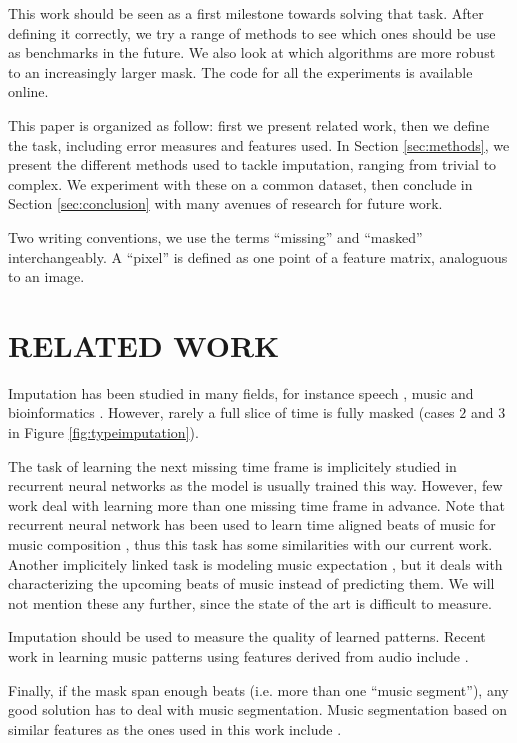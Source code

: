 \documentclass{article}
\begin{document}
This work should be seen as a first milestone towards solving that task.
After defining it correctly, we try a range of methods to see which ones should
be use as benchmarks in the future. We also look at which algorithms are more robust
to an increasingly larger mask. The code for all the experiments is available
online.

This paper is organized as follow: first we present related work, then we define the
task, including error measures and features used. In Section \ref{sec:methods},
we present the different methods used to tackle imputation, ranging from trivial
to complex. We experiment with these on a common dataset, then conclude in
Section \ref{sec:conclusion} with many avenues of research for future work.

Two writing conventions, we use the terms ``missing'' and ``masked'' interchangeably.
A ``pixel'' is defined as one point of a feature matrix, analoguous to an image.

\section{RELATED WORK}
\label{sec:relatedwork}
Imputation has been studied in many fields, for instance speech 
\cite{Morris1998,Reyes-Gomez2005,Smaragdis2009}, music \cite{Hoffman2010} 
and bioinformatics \cite{Oba2003}.
However, rarely a full slice of time is fully masked (cases $2$ and $3$
in Figure \ref{fig:typeimputation}).

The task of learning the next missing time frame is implicitely studied in recurrent
neural networks as the model is usually trained this way. However, few work deal
with learning more than one missing time frame in advance. Note that recurrent neural
network has been used to learn time aligned beats of music for music composition
\cite{Todd1989,Mozer1994a,Eck2002d}, thus this task has some similarities with our current
work. Another implicitely linked task is modeling music expectation \cite{Hazan2010}, but it deals
with characterizing the upcoming beats of music instead of predicting them.
We will not mention these any further, since the state of the art is difficult to measure.

Imputation should be used to measure the quality of learned patterns. Recent work in 
learning music patterns using features derived from audio include 
\cite{Anglade2009,Bertin-Mahieux2010a,Casey2007,Weiss2010}.

Finally, if the mask span enough beats (i.e. more than one ``music segment''), any good
solution has to deal with music segmentation. Music segmentation based on similar features as
the ones used in this work include \cite{Weiss2010,Levy2008,Mauch2009}.
\end{document}
